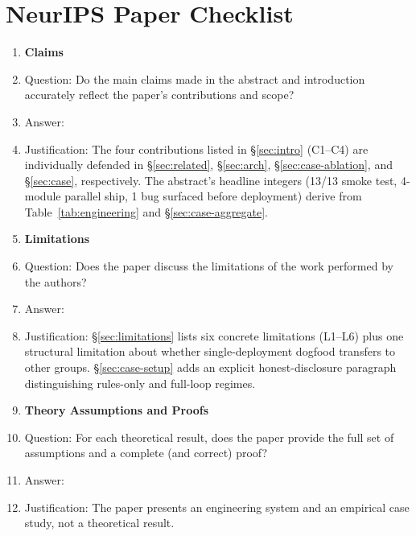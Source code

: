 \section*{NeurIPS Paper Checklist}

\begin{enumerate}

\item {\bf Claims}
    \item[] Question: Do the main claims made in the abstract and introduction accurately reflect the paper's contributions and scope?
    \item[] Answer: \answerYes{}
    \item[] Justification: The four contributions listed in \S\ref{sec:intro} (C1--C4) are individually defended in \S\ref{sec:related}, \S\ref{sec:arch}, \S\ref{sec:case-ablation}, and \S\ref{sec:case}, respectively. The abstract's headline integers (13/13 smoke test, 4-module parallel ship, 1 bug surfaced before deployment) derive from Table~\ref{tab:engineering} and \S\ref{sec:case-aggregate}.

\item {\bf Limitations}
    \item[] Question: Does the paper discuss the limitations of the work performed by the authors?
    \item[] Answer: \answerYes{}
    \item[] Justification: \S\ref{sec:limitations} lists six concrete limitations (L1--L6) plus one structural limitation about whether single-deployment dogfood transfers to other groups. \S\ref{sec:case-setup} adds an explicit honest-disclosure paragraph distinguishing rules-only and full-loop regimes.

\item {\bf Theory Assumptions and Proofs}
    \item[] Question: For each theoretical result, does the paper provide the full set of assumptions and a complete (and correct) proof?
    \item[] Answer: \answerNA{}
    \item[] Justification: The paper presents an engineering system and an empirical case study, not a theoretical result.


\end{enumerate}

